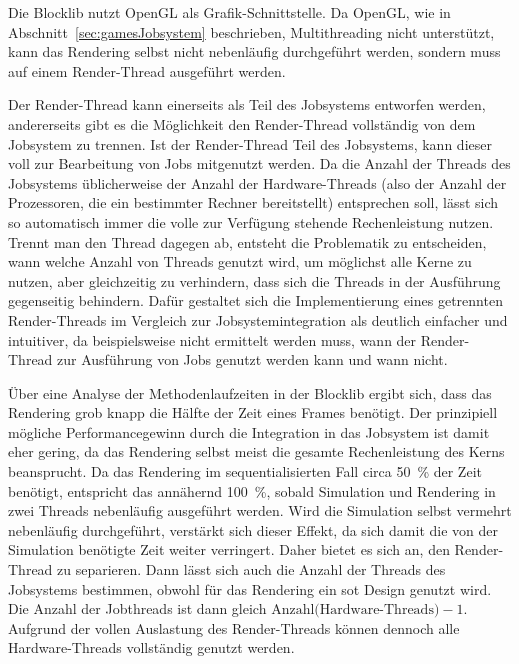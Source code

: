 
Die Blocklib nutzt OpenGL als Grafik-Schnittstelle. Da OpenGL, wie in Abschnitt~\ref{sec:gamesJobsystem} beschrieben, Multithreading nicht unterstützt, kann das Rendering selbst nicht nebenläufig durchgeführt werden, sondern muss auf einem Render-Thread ausgeführt werden.

Der Render-Thread kann einerseits als Teil des Jobsystems entworfen werden, andererseits gibt es die Möglichkeit den Render-Thread vollständig von dem Jobsystem zu trennen. Ist der Render-Thread Teil des Jobsystems, kann dieser voll zur Bearbeitung von Jobs mitgenutzt werden. Da die Anzahl der Threads des Jobsystems üblicherweise der Anzahl der Hardware-Threads (also der Anzahl der Prozessoren, die ein bestimmter Rechner bereitstellt) entsprechen soll, lässt sich so automatisch immer die volle zur Verfügung stehende Rechenleistung nutzen. Trennt man den Thread dagegen ab, entsteht die Problematik zu entscheiden, wann welche Anzahl von Threads genutzt wird, um möglichst alle Kerne zu nutzen, aber gleichzeitig zu verhindern, dass sich die Threads in der Ausführung gegenseitig behindern. Dafür gestaltet sich die Implementierung eines getrennten Render-Threads im Vergleich zur Jobsystemintegration als deutlich einfacher und intuitiver, da beispielsweise nicht ermittelt werden muss, wann der Render-Thread zur Ausführung von Jobs genutzt werden kann und wann nicht.

Über eine Analyse der Methodenlaufzeiten in der Blocklib ergibt sich, dass das Rendering grob knapp die Hälfte der Zeit eines Frames benötigt. Der prinzipiell mögliche Performancegewinn durch die Integration in das Jobsystem ist damit eher gering, da das Rendering selbst meist die gesamte Rechenleistung des Kerns beansprucht. Da das Rendering im sequentialisierten Fall circa \SI{50}{\percent} der Zeit benötigt, entspricht das annähernd \SI{100}{\percent}, sobald Simulation und Rendering in zwei Threads nebenläufig ausgeführt werden. Wird die Simulation selbst vermehrt nebenläufig durchgeführt, verstärkt sich dieser Effekt, da sich damit die von der Simulation benötigte Zeit weiter verringert. Daher bietet es sich an, den Render-Thread zu separieren. Dann lässt sich auch die Anzahl der Threads des Jobsystems bestimmen, obwohl für das Rendering ein \ac{sot} Design genutzt wird. Die Anzahl der Jobthreads ist dann gleich $\text{Anzahl(Hardware-Threads)} -1$. Aufgrund der vollen Auslastung des Render-Threads können dennoch alle Hardware-Threads vollständig genutzt werden.

